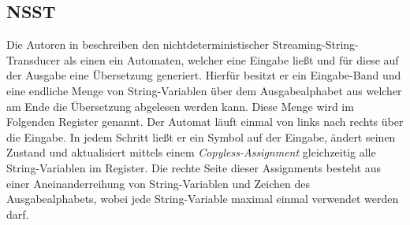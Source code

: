 \documentclass[conference]{IEEEtran}
\begin{document}
\subsection{NSST}
Die Autoren in \cite{nsst} beschreiben den nichtdeterministischer Streaming-String-Transducer als einen ein Automaten, welcher eine Eingabe ließt und für diese auf der Ausgabe eine Übersetzung generiert.
Hierfür besitzt er ein Eingabe-Band und eine endliche Menge von String-Variablen über dem Ausgabealphabet aus welcher am Ende die Übersetzung abgelesen werden kann.
Diese Menge wird im Folgenden Register genannt.
Der Automat läuft einmal von links nach rechts über die Eingabe.
In jedem Schritt ließt er ein Symbol auf der Eingabe, ändert seinen Zustand und aktualisiert mittels einem \textit{Copyless-Assignment} gleichzeitig alle String-Variablen im Register.
Die rechte Seite dieser Assignments besteht aus einer Aneinanderreihung von String-Variablen und Zeichen des Ausgabealphabets, wobei jede String-Variable maximal einmal verwendet werden darf.
\end{document}
